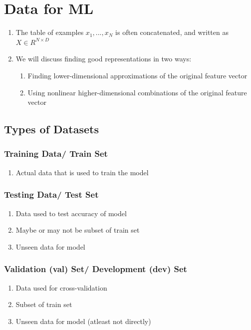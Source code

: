 \chapter{Data for ML}

\begin{enumerate}
    \item The table of examples ${x_1, ..., x_N}$ is often concatenated, and written as $X \in R^{N \times D}$
    \item We will discuss finding good representations in two ways:
    \begin{enumerate}
        \item Finding lower-dimensional approximations of the original feature vector
        \item Using nonlinear higher-dimensional combinations of the original feature vector
    \end{enumerate}
\end{enumerate}


\section{Types of Datasets \cite{dnn-1}}\label{Types of Datasets}

\subsection{Training Data/ Train Set}\label{Training Data/ Train Set}
\begin{enumerate}
    \item Actual data that is used to train the model
\end{enumerate}

\subsection{Testing Data/ Test Set}\label{Testing Data/ Test Set}
\begin{enumerate}
    \item Data used to test accuracy of model
    \item Maybe or may not be subset of train set
    \item Unseen data for model
\end{enumerate}

\subsection{Validation (val) Set/ Development (dev) Set}\label{Validation (val) Set/ Development (dev) Set}
\begin{enumerate}
    \item Data used for cross-validation
    \item Subset of train set
    \item Unseen data for model (atleast not directly)
\end{enumerate}

